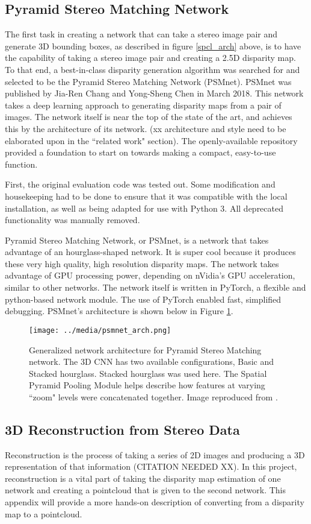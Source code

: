 \subsection{Pyramid Stereo Matching Network}
The first task in creating a network that can take a stereo image pair and generate 3D bounding boxes, as described in figure \ref{spcl_arch} above, is to have the capability of taking a stereo image pair and creating a 2.5D disparity map. To that end, a best-in-class disparity generation algorithm was searched for and selected to be the Pyramid Stereo Matching Network (PSMnet). PSMnet was published by Jia-Ren Chang and Yong-Sheng Chen in March 2018. This network takes a deep learning approach to generating disparity maps from a pair of images. The network itself is near the top of the state of the art, and achieves this by the architecture of its network. (xx architecture and style need to be elaborated upon in the ``related work" section). The openly-available repository provided a foundation to start on towards making a compact, easy-to-use function.

First, the original evaluation code was tested out. Some modification and housekeeping had to be done to ensure that it was compatible with the local installation, as well as being adapted for use with Python 3. All deprecated functionality was manually removed.

Pyramid Stereo Matching Network, or PSMnet, is a network that takes advantage of an hourglass-shaped network. It is super cool because it produces these very high quality, high resolution disparity maps. The network takes advantage of GPU processing power, depending on nVidia's GPU acceleration, similar to other networks. The network itself is written in PyTorch, a flexible and python-based network module. The use of PyTorch enabled fast, simplified debugging. PSMnet's architecture is shown below in Figure \ref{psmnet_arch}.


\begin{figure}[ht]
	\texttt{[image: ../media/psmnet\_arch.png]}
	\caption{Generalized network architecture for Pyramid Stereo Matching network. The 3D CNN has two available configurations, Basic and Stacked hourglass. Stacked hourglass was used here. The Spatial Pyramid Pooling Module helps describe how features at varying ``zoom" levels were concatenated together. Image reproduced from \cite{chang_pyramid_2018}.}
	\label{psmnet_arch}
\end{figure}

\subsection{3D Reconstruction from Stereo Data}
\label{sect_reconstruct}
Reconstruction is the process of taking a series of 2D images and producing a 3D representation of that information (CITATION NEEDED XX). In this project, reconstruction is a vital part of taking the disparity map estimation of one network and creating a pointcloud that is given to the second network. This appendix will provide a more hands-on description of converting from a disparity map to a pointcloud.

